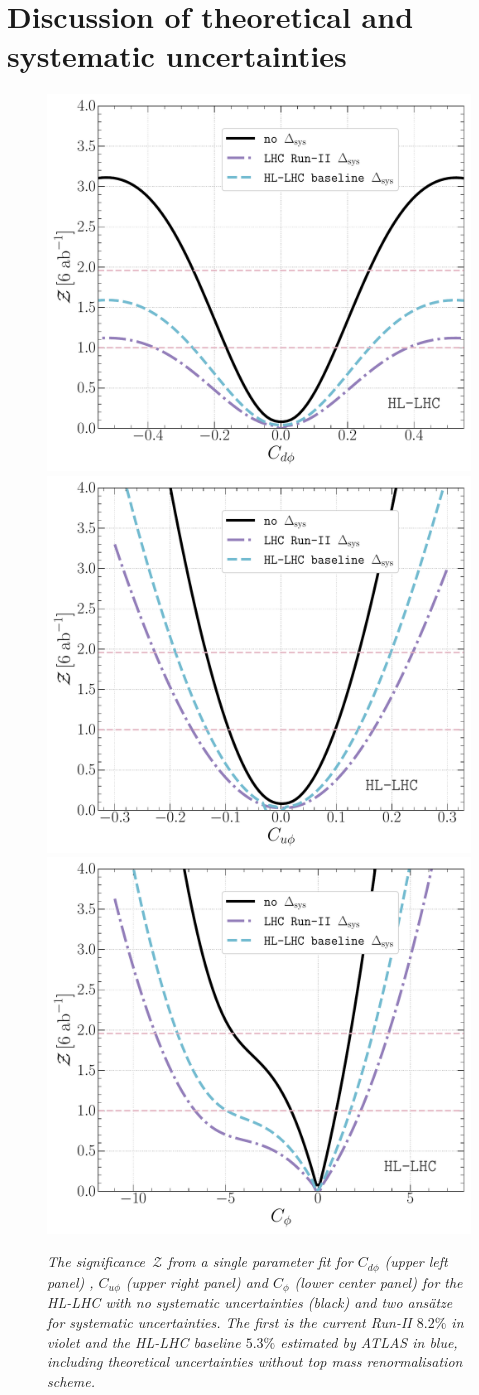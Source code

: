 \section{Discussion of theoretical and systematic uncertainties}
\label{sec:errors}

\begin{figure}[h!]
	\centering
	\includegraphics[width=0.4\linewidth]{fig/kd-systematics-HL-LHC.pdf}
	\includegraphics[width=0.4\linewidth]{fig/ku-systematics-HL-LHC.pdf}
	\includegraphics[width=0.4\linewidth]{fig/kl-systematics-HL-LHC.pdf}
	\caption{\it The significance~$\mathcal{Z}$ from a single parameter fit for $C_{d\phi}$ (upper left panel) , $C_{u\phi}$ (upper right panel) and $C_\phi$ (lower center panel) for the HL-LHC with  no systematic uncertainties (black) and two ansätze for systematic uncertainties. The first is the current Run-II $8.2\%$ in violet and the HL-LHC baseline $5.3\%$ estimated by ATLAS in blue, including theoretical uncertainties without top mass renormalisation scheme.}
	\label{fig:systematics}
\end{figure}


